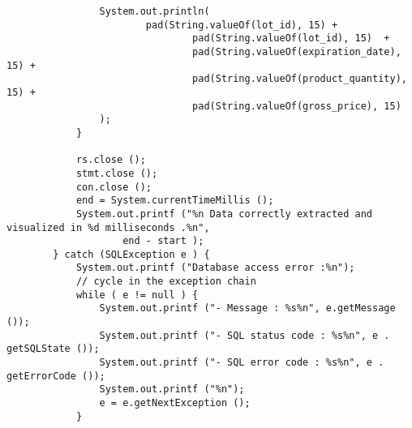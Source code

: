 \begin{lstlisting}
                System.out.println(
                        pad(String.valueOf(lot_id), 15) +
                                pad(String.valueOf(lot_id), 15)  +
                                pad(String.valueOf(expiration_date), 15) +
                                pad(String.valueOf(product_quantity), 15) +
                                pad(String.valueOf(gross_price), 15)
                );
            }

            rs.close ();
            stmt.close ();
            con.close ();
            end = System.currentTimeMillis ();
            System.out.printf ("%n Data correctly extracted and visualized in %d milliseconds .%n",
                    end - start );
        } catch (SQLException e ) {
            System.out.printf ("Database access error :%n");
            // cycle in the exception chain
            while ( e != null ) {
                System.out.printf ("- Message : %s%n", e.getMessage ());
                System.out.printf ("- SQL status code : %s%n", e . getSQLState ());
                System.out.printf ("- SQL error code : %s%n", e . getErrorCode ());
                System.out.printf ("%n");
                e = e.getNextException ();
            }


\end{lstlisting}
